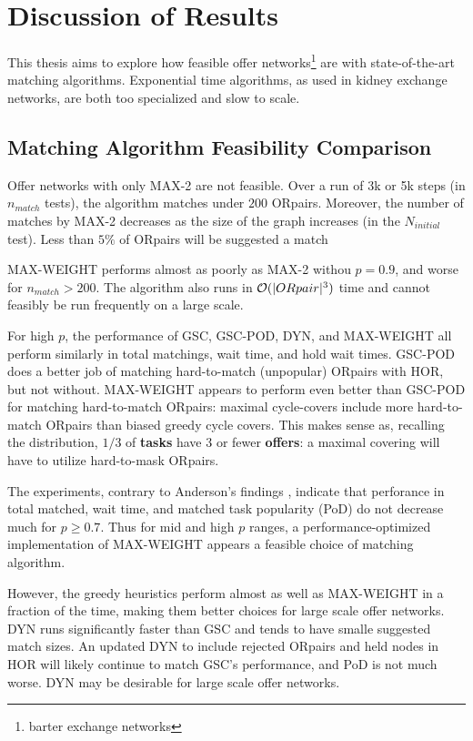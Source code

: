 \documentclass[main.tex]{subfiles}
\begin{document}
\section{Discussion of Results}
This thesis aims to explore how feasible offer networks\footnote{barter exchange networks} are with state-of-the-art matching algorithms. Exponential time algorithms, as used in kidney exchange networks, are both too specialized and slow to scale.

\subsection{Matching Algorithm Feasibility Comparison}

Offer networks with only MAX-2 are not feasible. Over a run of 3k or 5k steps (in $n_{match}$ tests), the algorithm matches under $200$ ORpairs. Moreover, the number of matches by MAX-2 decreases as the size of the graph increases (in the $N_{initial}$ test). Less than $5\%$ of ORpairs will be suggested a match

MAX-WEIGHT performs almost as poorly as MAX-2 withou $p = 0.9$, and worse for $n_{match} > 200$. The algorithm also runs in $\mathcal{O}(|ORpair|^3)$ time and cannot feasibly be run frequently on a large scale.

For high $p$, the performance of GSC, GSC-POD, DYN, and MAX-WEIGHT all perform similarly in total matchings, wait time, and hold wait times. GSC-POD does a better job of matching hard-to-match (unpopular) ORpairs with HOR, but not without. MAX-WEIGHT appears to perform even better than GSC-POD for matching hard-to-match ORpairs: maximal cycle-covers include more hard-to-match ORpairs than biased greedy cycle covers. This makes sense as, recalling the distribution, $1/3$ of \textbf{tasks} have 3 or fewer \textbf{offers}: a maximal covering will have to utilize hard-to-mask ORpairs.

The experiments, contrary to Anderson's findings \cite{And1}, indicate that perforance in total matched, wait time, and matched task popularity (PoD) do not decrease much for $p \geq 0.7$. Thus for mid and high $p$ ranges, a performance-optimized implementation of MAX-WEIGHT appears a feasible choice of matching algorithm.

However, the greedy heuristics perform almost as well as MAX-WEIGHT in a fraction of the time, making them better choices for large scale offer networks. DYN runs significantly faster than GSC and tends to have smalle suggested match sizes. An updated DYN to include rejected ORpairs and held nodes in HOR will likely continue to match GSC's performance, and PoD is not much worse. DYN may be desirable for large scale offer networks.
\end{document}
